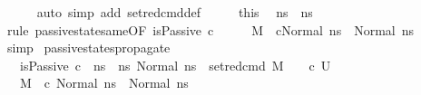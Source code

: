 \begin{isabellebody}
\ \ \ \ \isamarkupfalse%
\ {\isacharparenleft}{\kern0pt}auto\ simp\ add{\isacharcolon}{\kern0pt}\ set{\isacharunderscore}{\kern0pt}red{\isacharunderscore}{\kern0pt}cmd{\isacharunderscore}{\kern0pt}def{\isacharparenright}{\kern0pt}\isanewline
\ \ \isamarkupfalse%
\ \isamarkupfalse%
\ this\ \isamarkupfalse%
\ {\isachardoublequoteopen}ns{\isacharprime}{\kern0pt}\ {\isacharequal}{\kern0pt}\ ns{\isachardoublequoteclose}\isanewline
\ \ \ \ \isamarkupfalse%
\ {\isacharparenleft}{\kern0pt}rule\ passive{\isacharunderscore}{\kern0pt}state{\isacharunderscore}{\kern0pt}same{\isacharbrackleft}{\kern0pt}OF\ {\isacartoucheopen}isPassive\ c{\isacartoucheclose}{\isacharbrackright}{\kern0pt}{\isacharparenright}{\kern0pt}\isanewline
\ \ \isamarkupfalse%
\ \isamarkupfalse%
\ {\isachardoublequoteopen}M{\isacharcomma}{\kern0pt}{\isasymLambda}{\isacharcomma}{\kern0pt}{\isasymGamma}{\isacharcomma}{\kern0pt}{\isasymOmega}\ {\isasymturnstile}\ {\isasymlangle}c{\isacharcomma}{\kern0pt}Normal\ ns{\isacharprime}{\kern0pt}{\isasymrangle}\ {\isasymrightarrow}\ Normal\ ns{\isacharprime}{\kern0pt}{\isachardoublequoteclose}\isanewline
\ \ \ \ \isamarkupfalse%
\ simp\isanewline
{}\isamarkupfalse%
%
\endisatagproof
{\isafoldproof}%
%
\isadelimproof
\isanewline
%
\endisadelimproof
\isanewline
{}\isamarkupfalse%
\ passive{\isacharunderscore}{\kern0pt}states{\isacharunderscore}{\kern0pt}propagate{\isacharunderscore}{\kern0pt}{}{\isacharcolon}{\kern0pt}\isanewline
\ \ \ {\isachardoublequoteopen}isPassive\ c{\isachardoublequoteclose}\ \ {\isachardoublequoteopen}ns\ {\isasymin}\ {\isacharbraceleft}{\kern0pt}ns{\isacharprime}{\kern0pt}{\isachardot}{\kern0pt}\ Normal\ ns{\isacharprime}{\kern0pt}\ {\isasymin}\ {\isacharparenleft}{\kern0pt}set{\isacharunderscore}{\kern0pt}red{\isacharunderscore}{\kern0pt}cmd\ M\ {\isasymLambda}\ {\isasymGamma}\ {\isasymOmega}\ c\ U{\isacharparenright}{\kern0pt}{\isacharbraceright}{\kern0pt}{\isachardoublequoteclose}\isanewline
\ \ \ {\isachardoublequoteopen}M{\isacharcomma}{\kern0pt}{\isasymLambda}{\isacharcomma}{\kern0pt}{\isasymGamma}{\isacharcomma}{\kern0pt}{\isasymOmega}\ {\isasymturnstile}\ {\isasymlangle}c{\isacharcomma}{\kern0pt}\ Normal\ ns{\isasymrangle}\ {\isasymrightarrow}\ Normal\ ns{\isachardoublequoteclose}\isanewline
%
\isadelimproof
\ \ %
\endisadelimproof
%
\isatagproof
{}\isamarkupfalse%

\end{isabellebody}
